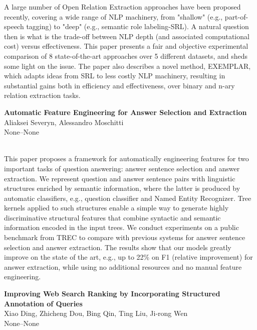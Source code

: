 \documentclass[twoside,makeidx]{book}
\begin{document}
\nopagebreak%
\noindent%
{\small A large number of Open Relation Extraction approaches have been proposed recently, covering a wide range of NLP machinery, from "shallow" (e.g., part-of-speech tagging) to "deep" (e.g., semantic role labeling-SRL). A natural question then is what is the trade-off between NLP depth (and associated computational cost) versus effectiveness. This paper presents a fair and objective experimental comparison of 8 state-of-the-art approaches over 5 different datasets, and sheds some light on the issue. The paper also describes a novel method, EXEMPLAR, which adapts ideas from SRL to less costly NLP machinery, resulting in substantial gains both in efficiency and effectiveness, over binary and n-ary relation extraction tasks.}
\par\vspace{2em}\noindent%
\begin{minipage}{\linewidth}%
\begin{center}
\textbf{\normalsize Automatic Feature Engineering for Answer Selection and Extraction}\\
\normalsize  Aliaksei Severyn,  Alessandro Moschitti\\
{\small None--None}\\
\end{center}
\end{minipage}\\[0.5em]
\nopagebreak%
\noindent%
{\small This paper proposes a framework for automatically engineering features for two important tasks of  question answering: answer sentence selection and answer extraction. We represent question and answer sentence pairs with linguistic structures enriched by semantic information, where the latter is produced by automatic classifiers, e.g., question classifier and Named Entity Recognizer. Tree kernels applied to such structures enable a simple way to generate highly discriminative structural features that combine syntactic and semantic information encoded in the input trees.   We conduct experiments on a public benchmark from TREC to compare with previous systems for answer sentence selection and answer extraction. The results show that our models greatly improve on the state of the art, e.g., up to 22\% on F1 (relative improvement) for answer extraction, while using no additional resources and no manual feature engineering.}
\par\vspace{2em}\noindent%
\begin{minipage}{\linewidth}%
\begin{center}
\textbf{\normalsize Improving Web Search Ranking by Incorporating Structured Annotation of Queries}\\
\normalsize  Xiao Ding,  Zhicheng Dou,  Bing Qin,  Ting Liu,  Ji-rong Wen\\
{\small None--None}\\
\end{center}
\end{minipage}\\[0.5em]
\end{document}
